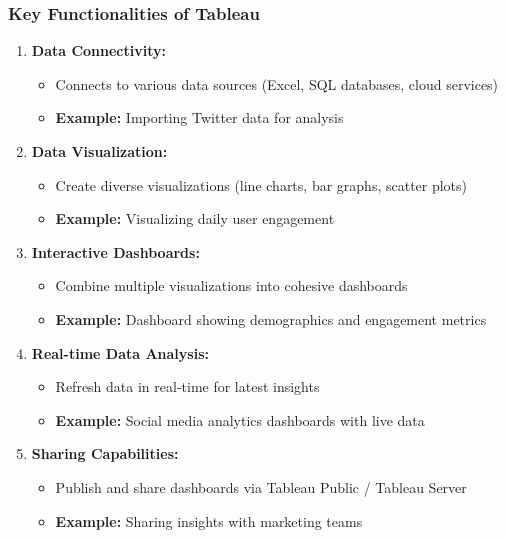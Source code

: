 \documentclass{beamer}
\begin{document}
\begin{frame}[fragile]
    \frametitle{Key Functionalities of Tableau}
    \begin{enumerate}
        \item \textbf{Data Connectivity:}
        \begin{itemize}
            \item Connects to various data sources (Excel, SQL databases, cloud services)
            \item \textbf{Example:} Importing Twitter data for analysis
        \end{itemize}

        \item \textbf{Data Visualization:}
        \begin{itemize}
            \item Create diverse visualizations (line charts, bar graphs, scatter plots)
            \item \textbf{Example:} Visualizing daily user engagement
        \end{itemize}

        \item \textbf{Interactive Dashboards:}
        \begin{itemize}
            \item Combine multiple visualizations into cohesive dashboards
            \item \textbf{Example:} Dashboard showing demographics and engagement metrics
        \end{itemize}

        \item \textbf{Real-time Data Analysis:}
        \begin{itemize}
            \item Refresh data in real-time for latest insights
            \item \textbf{Example:} Social media analytics dashboards with live data
        \end{itemize}

        \item \textbf{Sharing Capabilities:}
        \begin{itemize}
            \item Publish and share dashboards via Tableau Public / Tableau Server
            \item \textbf{Example:} Sharing insights with marketing teams
        \end{itemize}
    \end{enumerate}
\end{frame}
\end{document}
